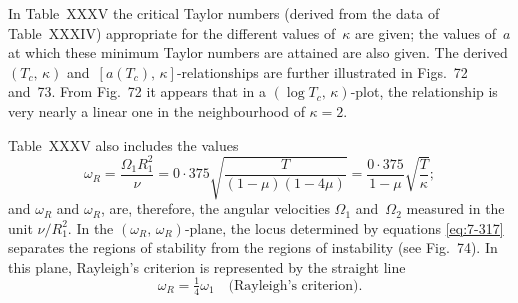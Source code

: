 In Table~XXXV the critical Taylor numbers (derived from the data
of Table~XXXIV) appropriate for the different values of~$\kappa$ are given;
the values of~$a$ at which these minimum Taylor numbers are attained are
also given.  The derived $(T_c,\,\kappa)$ and~$[a(T_c),\,\kappa]$-relationships are further
illustrated in Figs.~72 and~73.  From Fig.~72 it appears that in a $(\log T_c,\,\kappa)$-plot, the relationship is very nearly a linear one in the neighbourhood
of $\kappa = 2$.

Table~XXXV also includes the values
\begin{equation}
\label{eq:7-317}
\omega_R = \frac{\Omega_1 R_1^2}{\nu}
  = 0{\cdot}375\sqrt{\frac{T}{(1-\mu)(1-4\mu)}}
  = \frac{0{\cdot}375}{1-\mu}\sqrt{\frac{T}{\kappa}};
\end{equation}
and $\omega_R$ and $\omega_R$, are, therefore, the angular velocities $\Omega_1$ and~$\Omega_2$ measured in
the unit $\nu/R_1^2$.  In the $(\omega_R,\,\omega_R)$-plane, the locus determined by equations
\eqref{eq:7-317} separates the regions of stability from the regions of instability
(see Fig.~74).  In this plane, Rayleigh's criterion is represented by the
straight line
\begin{equation}
\label{eq:7-318}
\omega_R = \tfrac{1}{4}\omega_1 \quad \text{(Rayleigh's criterion).}
\end{equation}


